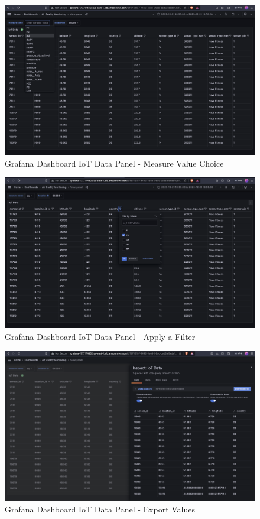 \documentclass[12pt,oneside]{book} %
\begin{document}
\begin{figure}[H]
    \centering
    \includegraphics[width=1\linewidth]{images/measure-value.png}
    \caption{Grafana Dashboard IoT Data Panel - Measure Value Choice}\label{fig:top-100-locations-most-affected}
\end{figure}

\begin{figure}[H]
    \centering
    \includegraphics[width=1\linewidth]{images/filter.png}
    \caption{Grafana Dashboard IoT Data Panel - Apply a Filter}\label{fig:top-100-locations-most-affected}
\end{figure}

\begin{figure}[H]
    \centering
    \includegraphics[width=1\linewidth]{images/export-2.png}
    \caption{Grafana Dashboard IoT Data Panel - Export Values}\label{fig:top-100-locations-most-affected}
\end{figure}
\end{document}
